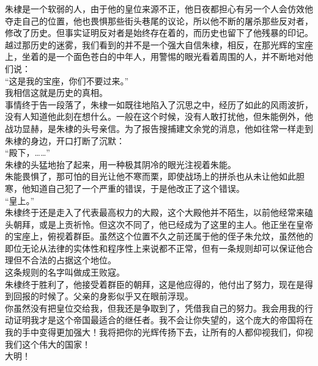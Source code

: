 \begin{multicols}{\theparacolNo}
朱棣是一个软弱的人，由于他的皇位来源不正，他日夜都担心有另一个人会仿效他夺走自己的位置，他也畏惧那些街头巷尾的议论，所以他不断的屠杀那些反对者，修改了历史。但事实证明反对者是始终存在着的，而历史也留下了他残暴的印记。\\

越过那历史的迷雾，我们看到的并不是一个强大自信朱棣，相反，在那光辉的宝座上，坐着的是一个面色苍白的中年人，用警惕的眼光看着周围的人，并不断地对他们说：\\

“这是我的宝座，你们不要过来。”\\

我相信这就是历史的真相。\\

事情终于告一段落了，朱棣一如既往地陷入了沉思之中，经历了如此的风雨波折，没有人知道他此刻在想什么。一般在这个时候，没有人敢打扰他，但朱能例外，他战功显赫，是朱棣的头号亲信。为了报告搜捕建文余党的消息，他如往常一样走到朱棣的身边，开口打断了沉默：\\

“殿下，……”\\

朱棣的头猛地抬了起来，用一种极其阴冷的眼光注视着朱能。\\

朱能畏惧了，那可怕的目光让他不寒而栗，即使战场上的拼杀也从未让他如此胆寒，他知道自己犯了一个严重的错误，于是他改正了这个错误。\\

“皇上。”\\

朱棣终于还是走入了代表最高权力的大殿，这个大殿他并不陌生，以前他经常来磕头朝拜，或是上贡祈怜。但这次不同了，他已经成为了这里的主人。他正坐在皇帝的宝座上，俯视着群臣。虽然这个位置不久之前还属于他的侄子朱允炆，虽然他的即位无论从法律的实体性和程序性上来说都不正常，但有一条规则却可以保证他合理但不合法的占据这个地位。\\

这条规则的名字叫做成王败寇。\\

朱棣终于胜利了，他接受着群臣的朝拜，这是他应得的，他付出了努力，现在是得到回报的时候了。父亲的身影似乎又在眼前浮现。\\

你虽然没有把皇位交给我，但我还是争取到了，凭借我自己的努力。我会用我的行动证明我才是这个帝国最适合的继任者。我不会让你失望的，这个庞大的帝国将在我的手中变得更加强大！我将把你的光辉传扬下去，让所有的人都仰视我们，仰视我们这个伟大的国家！\\

大明！\\
\ifnum{}
	\end{multicols}
\fi
